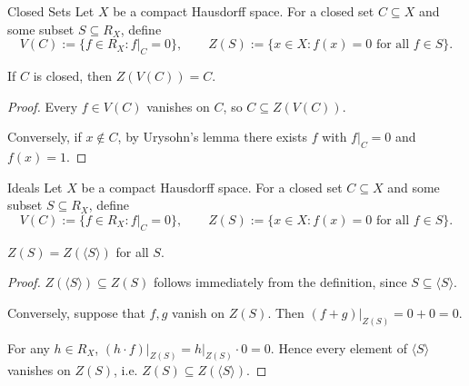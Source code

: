 \documentclass[aspectratio=169,10pt]{beamer}
\begin{document}
\begin{frame}{Closed Sets}
    Let $X$ be a compact Hausdorff space. For a closed set $C \subseteq X$ and some subset $S \subseteq R_X$, define
    \[
        V(C) := \{f \in R_X : f|_C = 0\}, \qquad Z(S) := \{x\in X : f(x)=0 \text{ for all }f \in S\}.
    \]

    \pause
    \begin{theorem}
        If $C$ is closed, then $Z(V(C)) = C$.
    \end{theorem}

    \pause
    \begin{proof}
        Every $f \in V(C)$ vanishes on $C$, so $C \subseteq Z(V(C))$.
        
        Conversely, if $x \notin C$, by Urysohn's lemma there exists $f$ with $f|_C = 0$ and $f(x) = 1$.
    \end{proof}
\end{frame}

\begin{frame}{Ideals}
    Let $X$ be a compact Hausdorff space. For a closed set $C \subseteq X$ and some subset $S \subseteq R_X$, define
    \[
        V(C) := \{f \in R_X : f|_C = 0\}, \qquad Z(S) := \{x\in X : f(x)=0 \text{ for all }f \in S\}.
    \]

    \pause
    \begin{theorem}
        $Z(S) = Z(\langle S \rangle)$ for all $S$.
    \end{theorem}

    \pause
    \begin{proof}
        $Z(\langle S \rangle) \subseteq Z(S)$ follows immediately from the definition, since $S \subseteq \langle S \rangle$.

        Conversely, suppose that $f,g$ vanish on $Z(S)$. Then $(f+g)\vert_{Z(S)} = 0+0 =0$.
        
        For any $h \in R_X$, $(h \cdot f)\vert_{Z(S)} = h\vert_{Z(S)} \cdot 0 = 0$. Hence every element of $\langle S \rangle$ vanishes on $Z(S)$, i.e. $Z(S) \subseteq Z(\langle S \rangle)$.
    \end{proof}


\end{frame}
\end{document}
